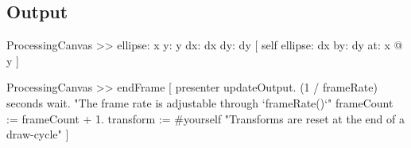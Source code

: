 \subsection{Output}


\begin{code}
ProcessingCanvas >> ellipse: x y: y dx: dx dy: dy [
	self
		ellipse: dx
		by: dy
		at: x @ y
]
\end{code}


\begin{code}
ProcessingCanvas >> endFrame [
	presenter updateOutput.
	(1 / frameRate) seconds wait.	"The frame rate is adjustable through `frameRate()`"
	frameCount := frameCount + 1.
	transform := #yourself	"Transforms are reset at the end of a draw-cycle"
]
\end{code}
